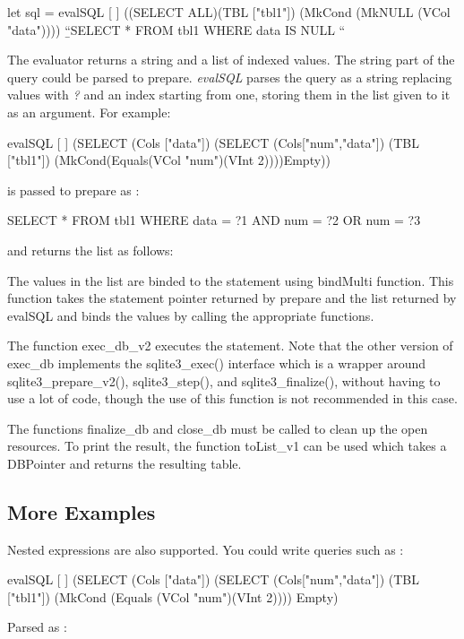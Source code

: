 \documentclass[11pt]{article}
\begin{document}
let sql = evalSQL [ ] ((SELECT ALL)(TBL ["tbl1"]) (MkCond (MkNULL (VCol "data"))))
\newline
{}
\b{“SELECT * FROM tbl1 WHERE data IS NULL “}

The evaluator returns a string and a list of indexed values.
The string part of the query could be parsed to prepare. 
\emph{evalSQL} parses the query as a string replacing values with \emph{?} and an index starting from one,
storing them in the list given to it as an argument.
For example:


evalSQL [ ] (SELECT (Cols ["data"]) (SELECT (Cols["num","data"]) (TBL ["tbl1"])
\newline (MkCond(Equals(VCol "num")(VInt 2))))Empty))

is passed to prepare as :

SELECT * FROM tbl1 WHERE data = ?1 AND num = ?2 OR num = ?3

and returns the list as follows:

The values in the list are binded to the statement using bindMulti function.
This function takes the statement pointer returned by prepare and the list returned by evalSQL
and binds the values by calling the appropriate functions.

The function exec\_db\_v2 executes the statement.
Note that the other version of exec\_db implements the sqlite3\_exec() interface which is a wrapper
around sqlite3\_prepare\_v2(), sqlite3\_step(), and sqlite3\_finalize(),
without having to use a lot of code, though the use of this function is not recommended in this case.

The functions finalize\_db and close\_db must be called to clean up the open resources.
To print the result, the function toList\_v1 can be used which takes a DBPointer and returns 
the resulting table.

\subsection{More Examples}
\label{More Examples}
Nested expressions are also supported. You could write queries such as :

evalSQL [ ] (SELECT (Cols ["data"]) (SELECT (Cols["num","data"]) (TBL ["tbl1"]) (MkCond (Equals (VCol "num")(VInt 2)))) Empty)

Parsed as :
\end{document}
